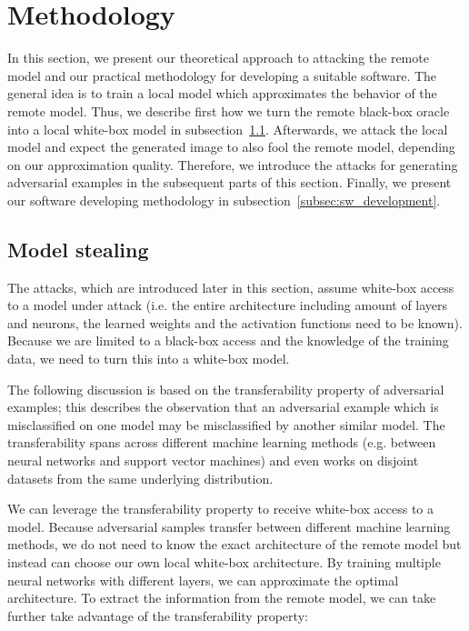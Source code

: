 
\section{Methodology}\label{sec:methodology}

In this section, we present our theoretical approach to attacking the remote model and our practical methodology for developing a suitable software.
The general idea is to train a local model which approximates the behavior of the remote model.
Thus, we describe first how we turn the remote black-box oracle into a local white-box model in subsection~\ref{subsec:modelstealing}.
Afterwards, we attack the local model and expect the generated image to also fool the remote model, depending on our approximation quality.
Therefore, we introduce the attacks for generating adversarial examples in the subsequent parts of this section.
Finally, we present our software developing methodology in subsection~\ref{subsec:sw_development}.

\subsection{Model stealing}\label{subsec:modelstealing}

The attacks, which are introduced later in this section, assume white-box access to a model under attack (i.e. the entire architecture including amount of layers and neurons, the learned weights and the activation functions need to be known).
Because we are limited to a black-box access and the knowledge of the training data, we need to turn this into a white-box model.

The following discussion is based on the transferability property of adversarial examples; this describes the observation that an adversarial example which is misclassified on one model may be misclassified by another similar model.
The transferability spans across different machine learning methods (e.g. between neural networks and support vector machines) and even works on disjoint datasets from the same underlying distribution. \cite{papernot2016transferability,goodfellow6572explaining, szegedy2013intriguing}

We can leverage the transferability property to receive white-box access to a model.
Because adversarial samples transfer between different machine learning methods, we do not need to know the exact architecture of the remote model but instead can choose our own local white-box architecture.
By training multiple neural networks with different layers, we can approximate the optimal architecture.
To extract the information from the remote model, we can take further take advantage of the transferability property:


